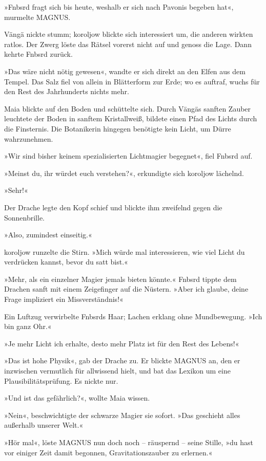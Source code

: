 »Fnbsrd fragt sich bis heute, weshalb er sich nach Pavonis begeben hat«, murmelte MAGNUS.

Vängä nickte stumm; koroljow blickte sich interessiert um, die anderen wirkten ratlos. Der Zwerg löste das Rätsel vorerst nicht auf und genoss die Lage. Dann kehrte Fnbsrd zurück.

»Das wäre nicht nötig gewesen«, wandte er sich direkt an den Elfen aus dem Tempel. Das Salz fiel von allein in Blätterform zur Erde; wo es auftraf, wuchs für den Rest des Jahrhunderts nichts mehr.

Maia blickte auf den Boden und schüttelte sich. Durch Vängäs sanften Zauber leuchtete der Boden in sanftem Kristallweiß, bildete einen Pfad des Lichts durch die Finsternis. Die Botanikerin hingegen benötigte kein Licht, um Dürre wahrzunehmen.

»Wir sind bisher keinem spezialisierten Lichtmagier begegnet«, fiel Fnbsrd auf.

»Meinst du, ihr würdet euch verstehen?«, erkundigte sich koroljow lächelnd.

»Sehr!«

Der Drache legte den Kopf schief und blickte ihm zweifelnd gegen die Sonnenbrille.

»Also, zumindest einseitig.«

koroljow runzelte die Stirn. »Mich würde mal interessieren, wie viel Licht du verdrücken kannst, bevor du satt bist.«

»Mehr, als ein einzelner Magier jemals bieten könnte.« Fnbsrd tippte dem Drachen sanft mit einem Zeigefinger auf die Nüstern. »Aber ich glaube, deine Frage impliziert ein Missverständnis!«

Ein Luftzug verwirbelte Fnbsrds Haar; Lachen erklang ohne Mundbewegung. »Ich bin ganz Ohr.«

»Je mehr Licht ich erhalte, desto mehr Platz ist für den Rest des Lebens!«

»Das ist hohe Physik«, gab der Drache zu. Er blickte MAGNUS an, den er inzwischen vermutlich für allwissend hielt, und bat das Lexikon um eine Plausibilitätsprüfung. Es nickte nur.

»Und ist das gefährlich?«, wollte Maia wissen.

»Nein«, beschwichtigte der schwarze Magier sie sofort. »Das geschieht alles außerhalb unserer Welt.«

»Hör mal«, löste MAGNUS nun doch noch – räuspernd – seine Stille, »du hast vor einiger Zeit damit begonnen, Gravitationszauber zu erlernen.«

